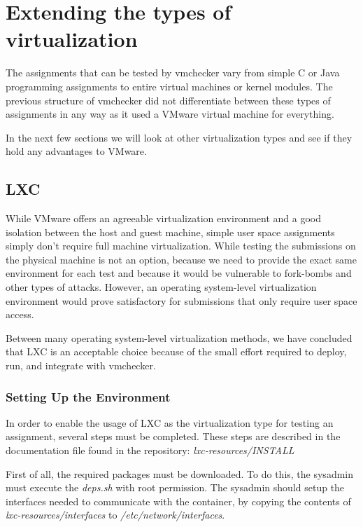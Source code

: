 \chapter{Extending the types of virtualization}
\label{chapter:virt-types}

The assignments that can be tested by vmchecker vary from simple C or Java
programming assignments to entire virtual machines or kernel modules.
The previous structure of vmchecker did not differentiate between these types of
assignments in any way as it used a VMware virtual machine for everything.

In the next few sections we will look at other virtualization types and see if
they hold any advantages to VMware.

\section{LXC}
\label{sec:vmc-lxc}

While VMware offers an agreeable virtualization environment and a good isolation
between the host and guest machine, simple user space assignments simply don't 
require full machine virtualization. While testing the submissions on the 
physical machine is not an option, because we need to provide the exact same
environment for each test and because it would be vulnerable to fork-bombs and 
other types of attacks. However, an operating system-level virtualization 
environment would prove satisfactory for submissions that only require user space
access.

Between many operating system-level virtualization methods, we have concluded
that LXC is an acceptable choice because of the small effort required to 
deploy, run, and integrate with vmchecker.


\subsection {Setting Up the Environment}
\label{sub-sec:vmc-lxc-env}

In order to enable the usage of LXC as the virtualization type for testing an 
assignment, several steps must be completed. These steps are described in the 
documentation file found in the repository: \textit{lxc-resources/INSTALL}

First of all, the required packages must be downloaded. To do this, the sysadmin
must  execute the \textit{deps.sh} with root permission. The sysadmin should
setup the interfaces needed to communicate with the container, by copying the
contents of \textit{lxc-resources/interfaces} to \textit{/etc/network/interfaces}.

